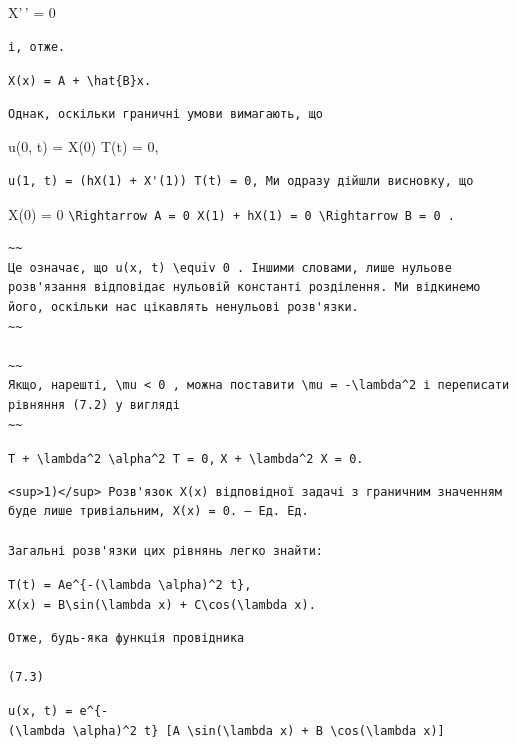 \documentclass[
  ukrainian,
]{article}
\begin{document}
X'\,' = 0

\begin{verbatim}
і, отже.
\end{verbatim}

\texttt{X(x)\ =\ A\ +\ \textbackslash{}hat\{B\}x.}

\begin{verbatim}
Однак, оскільки граничні умови вимагають, що
\end{verbatim}

u(0, t) = X(0) T(t) = 0,

\begin{verbatim}
u(1, t) = (hX(1) + X'(1)) T(t) = 0, Ми одразу дійшли висновку, що
\end{verbatim}

X(0) = 0
\texttt{\textbackslash{}Rightarrow\ A\ =\ 0\ X\textquotesingle{}(1)\ +\ hX(1)\ =\ 0\ \textbackslash{}Rightarrow\ B\ =\ 0\ .}

\begin{verbatim}
~~
Це означає, що u(x, t) \equiv 0 . Іншими словами, лише нульове розв'язання відповідає нульовій константі розділення. Ми відкинемо його, оскільки нас цікавлять ненульові розв'язки.
~~

~~
Якщо, нарешті, \mu < 0 , можна поставити \mu = -\lambda^2 і переписати рівняння (7.2) у вигляді
~~
\end{verbatim}

\texttt{T\textquotesingle{}\ +\ \textbackslash{}lambda\^{}2\ \textbackslash{}alpha\^{}2\ T\ =\ 0,}
\texttt{X\textquotesingle{}\ +\ \textbackslash{}lambda\^{}2\ X\ =\ 0.}

\begin{verbatim}
<sup>1)</sup> Розв'язок X(x) відповідної задачі з граничним значенням буде лише тривіальним, X(x) = 0. — Ед. Ед.

Загальні розв'язки цих рівнянь легко знайти:
\end{verbatim}

\texttt{T(t)\ =\ Ae\^{}\{-(\textbackslash{}lambda\ \textbackslash{}alpha)\^{}2\ t\},}
\texttt{X(x)\ =\ B\textbackslash{}sin(\textbackslash{}lambda\ x)\ +\ C\textbackslash{}cos(\textbackslash{}lambda\ x).}

\begin{verbatim}
Отже, будь-яка функція провідника

(7.3)
\end{verbatim}

\texttt{u(x,\ t)\ =\ e\^{}\{-(\textbackslash{}lambda\ \textbackslash{}alpha)\^{}2\ t\}\ {[}A\ \textbackslash{}sin(\textbackslash{}lambda\ x)\ +\ B\ \textbackslash{}cos(\textbackslash{}lambda\ x){]}}
\end{document}
